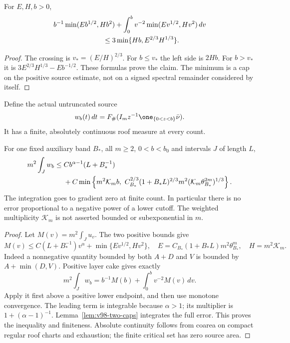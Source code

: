 \begin{lemma}
\label{lem:v98-two-caps}
For $E,H,b>0$,
\begin{align}
 &b^{-1}\min(Eb^{1/2},Hb^2)
       +\int_0^b v^{-2}\min(Ev^{1/2},Hv^2)\,dv\notag\\
 &\hspace{25mm}\le3\min\{Hb,E^{2/3}H^{1/3}\}.
                                      \label{eq:v98-two-caps}
\end{align}
\end{lemma}
\begin{proof}
The crossing is $v_*=(E/H)^{2/3}$. For $b\le v_*$ the left side
is $2Hb$. For $b>v_*$ it is
$3E^{2/3}H^{1/3}-Eb^{-1/2}$. These formulas prove the claim.
The minimum is a cap on the positive source estimate, not on a
signed spectral remainder considered by itself.
\end{proof}

Define the actual untruncated source
\[
 w_b(t)\,dt=F_\#(I_mz^{-1}\one_{\{0<z<b\}}\bar\nu).
\]
It has a finite, absolutely continuous roof measure at every count.

\begin{theorem}
\label{thm:v98-uncut-insertion}
For one fixed auxiliary band $B_*$, all $m\ge2$, $0<b<b_0$ and
intervals $J$ of length $L$,
\begin{align}
 m^2\int_J w_b
 \le{}&C b^{\alpha-1}(L+B_*^{-1})\notag\\
 &+C\min\left\{m^2\mathcal K_m b,\ 
 C_{B_*}^{2/3}(1+B_*L)^{2/3}m^2
              (\mathcal K_m\theta_{B_*}^{2m})^{1/3}\right\}.
                                      \label{eq:v98-uncut-insertion}
\end{align}
The integration goes to gradient zero at finite count. In particular
there is no error proportional to a negative power of a lower cutoff.
The weighted multiplicity $\mathcal K_m$ is not asserted bounded or
subexponential in $m$.
\end{theorem}
\begin{proof}
Let $M(v)=m^2\int_Ju_v$. The two positive bounds give
\[
 M(v)\le C(L+B_*^{-1})v^\alpha
   +\min\{Ev^{1/2},Hv^2\},
 \quad E=C_{B_*}(1+B_*L)m^2\theta_{B_*}^m,
 \quad H=m^2\mathcal K_m.
\]
Indeed a nonnegative quantity bounded by both $A+D$ and $V$ is
bounded by $A+\min(D,V)$. Positive layer cake gives exactly
\[
 m^2\int_Jw_b=b^{-1}M(b)+\int_0^b v^{-2}M(v)\,dv.
\]
Apply it first above a positive lower endpoint, and then use monotone
convergence. The leading term is integrable because $\alpha>1$;
its multiplier is $1+(\alpha-1)^{-1}$. Lemma~\ref{lem:v98-two-caps}
integrates the full error. This proves the inequality and finiteness.
Absolute continuity follows from coarea on compact regular roof
charts and exhaustion; the finite critical set has zero source area.
\end{proof}

